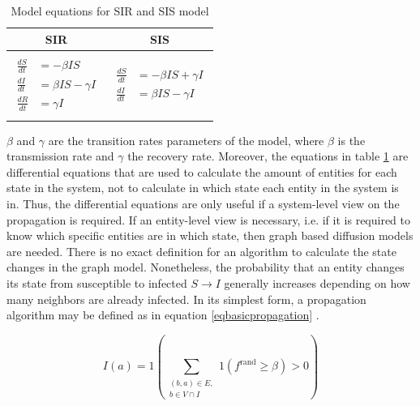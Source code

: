 \begin{table}[ht!]
    \centering
    \begin{tabular}{|c | c |} 
     \hline
     SIR & SIS  \\ 
     \hline
     & \\
     $\begin{aligned}
          \frac{dS}{dt} &= -\beta I S \\
          \frac{dI}{dt} &= \beta I S - \gamma I \\
          \frac{dR}{dt} &= \gamma I  
        \end{aligned}$
      &
      $\begin{aligned}
          \frac{dS}{dt} &= -\beta I S + \gamma I\\
          \frac{dI}{dt} &= \beta I S - \gamma I
        \end{aligned}$
       \\ 
       & \\
     \hline
    \end{tabular}
    \caption{Model equations for SIR and SIS model \cite{sirequation}}
    \label{SI-table-equations}
\end{table}

$\beta$ and $\gamma$ are the transition rates parameters of the model, where 
$\beta$ is the transmission rate and $\gamma$ the 
recovery rate. Moreover, the equations in table \ref{SI-table-equations}
are differential equations that are used to calculate the amount
of entities for each state in the system, not to calculate in which state
each entity in the system is in. Thus, the differential equations are 
only useful if a system-level view on the propagation is required.
If an entity-level view is necessary, i.e. if it is required to know which 
specific entities are in which state, then graph based diffusion models are needed.
There is no exact definition for an algorithm to calculate the state changes in the
graph model. Nonetheless, the probability that an entity changes
its state from susceptible to infected $S \to I$ generally increases depending on
how many neighbors are already infected. In its simplest form, a
propagation algorithm may be defined as in equation \ref{eqbasicpropagation} 
\cite{easypropagation}.

\begin{equation}
    I(a) = 1 (\sum\limits_{\substack{(b,a)\in E, \\ b \in V \cap I}}
    1(f^{\mathrm{rand}}\geq \beta)>0) 
    \label{eqbasicpropagation}
\end{equation}

